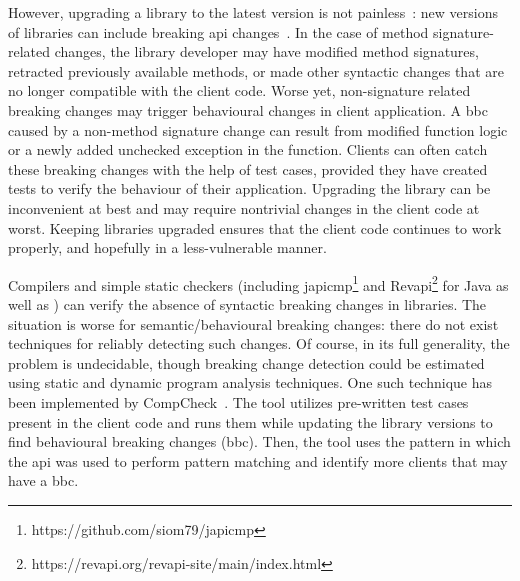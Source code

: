 

However, upgrading a library to the latest version is not painless~\cite{elizalde18:_towar_smoot_librar_migrat,derr17:_keep,dann23:_upcy}:
new versions of libraries can include breaking \gls{api} changes~\cite{dietrich14:_broken}. In the case
of method signature-related changes, the library developer may have modified method signatures,
retracted previously available methods, or made other syntactic changes that are no longer
compatible with the client code. Worse yet, non-signature related breaking changes may trigger behavioural
changes in client application.
A \gls{bbc} caused by a non-method signature change can result from modified function logic or
a newly added unchecked exception in the function.
Clients can often catch these breaking changes with the help of test cases, provided they have created
tests to verify the behaviour of their application.
Upgrading the library can be inconvenient at best and may require nontrivial changes in the client
code at worst. Keeping libraries upgraded ensures that the client code
continues to work properly, and hopefully in a less-vulnerable manner.

Compilers and simple static
checkers (including japicmp\footnote{https://github.com/siom79/japicmp} and
Revapi\footnote{https://revapi.org/revapi-site/main/index.html} for Java as well
as \cite{brito18:_apidif,foo18:_effic_static_check_librar_updat})
can verify the absence of syntactic breaking changes in libraries. The situation
is worse for semantic/behavioural breaking changes:
there do not exist techniques for reliably detecting such changes. Of
course, in its full generality, the problem is undecidable, though
breaking change detection could be estimated using static and dynamic program analysis
techniques. One such technique has been implemented by CompCheck~\cite{CompCheck}.
The tool utilizes pre-written test cases present in the client code and runs them
while updating the library versions to find behavioural breaking changes (\gls{bbc}). Then,
the tool uses the pattern in which the \gls{api} was used to perform pattern matching
and identify more clients that may have a \gls{bbc}.

